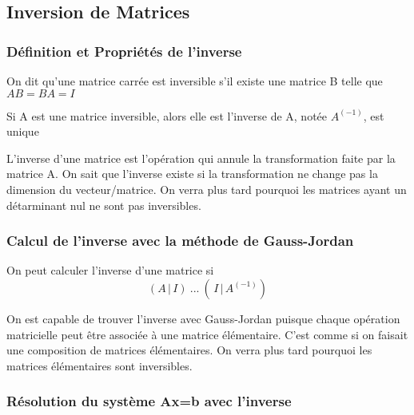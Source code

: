 \documentclass{article}
\begin{document}
\subsection{Inversion de Matrices}

\subsubsection{Définition et Propriétés de l'inverse}

\begin{definition}
    On dit qu'une matrice carrée est inversible s'il existe une matrice B
    telle que $AB=BA=I$
\end{definition}

\begin{theorem}
    Si A est une matrice inversible, alors elle est l'inverse de A, notée
    $A^(-1)$, est unique
\end{theorem}

\begin{remark}
    L'inverse d'une matrice est l'opération qui annule la transformation
    faite par la matrice A. On sait que l'inverse existe si la
    transformation ne change pas la dimension du vecteur/matrice. On
    verra plus tard pourquoi les matrices ayant un détarminant nul ne
    sont pas inversibles.
\end{remark}

\subsubsection{Calcul de l'inverse avec la méthode de Gauss-Jordan}

\begin{definition}
    On peut calculer l'inverse d'une matrice si $$ (A \, | \, I) ~ ...
    ~ (\, I \, | \, A^(-1))$$
\end{definition}

\begin{intuition}
    On est capable de trouver l'inverse avec Gauss-Jordan puisque chaque
    opération matricielle peut être associée à une matrice élémentaire.
    C'est comme si on faisait une composition de matrices élémentaires.
    On verra plus tard pourquoi les matrices élémentaires sont inversibles.
\end{intuition}

\subsubsection{Résolution du système Ax=b avec l'inverse}
\end{document}
